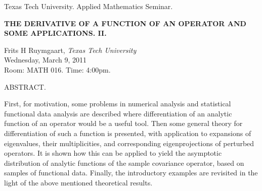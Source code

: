 \documentclass[oneside]{amsart}
\newcommand{\talktitle}{The derivative of a function of an operator and some applications. II.}
\newcommand{\talkspeaker}{ {\sc Frits H Ruymgaart}, \textit{Texas Tech University}}
\newcommand{\talkdate}{Wednesday, March 9, 2011}
\newcommand{\timelocation}{Room: MATH 016.  Time: 4:00pm.}
\newcommand{\talkabstract}{
First, for motivation, some problems in numerical analysis and statistical functional data analysis are described where differentiation of an analytic function of an operator would be a useful tool. Then some general theory for differentiation of such a function is presented, with application to expansions of eigenvalues, their multiplicities, and corresponding eigenprojections of perturbed operators. It is shown how this can be applied to yield the asymptotic distribution of analytic functions of the sample covariance operator, based on samples of functional data. Finally, the introductory examples are revisited in the light of the above mentioned theoretical results.
}
\begin{document}
\thispagestyle{empty}

\begin{center}
Texas Tech University.  Applied Mathematics Seminar.
\end{center}

\begin{center}

\textbf{\Huge {\uppercase{\talktitle}} }

{\Large
\talkspeaker\\
\talkdate\\
\timelocation
}
\end{center}

\vspace*{10pt}

{\Huge
ABSTRACT.
\talkabstract
}
\end{document}
